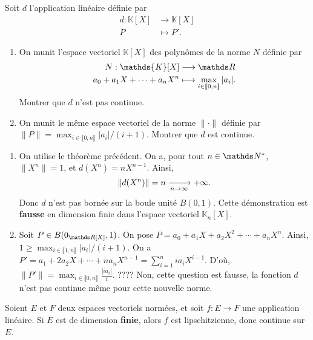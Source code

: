 \begin{exo}
	\begin{slshape}
		Soit $d$\/ l'application linéaire définie par \begin{align*}
			d: \mathds{K}[X] &\longrightarrow \mathds{K}[X] \\
			P &\longmapsto P'.
		\end{align*}
		\begin{enumerate}
			\item On munit l'espace vectoriel $\mathds{K}[X]$\/ des polynômes de la norme $N$\/ définie par \begin{align*}
					N: \mathds{K}[X] &\longrightarrow \R \\
					a_0 + a_1 X + \cdots + a_n X^n &\longmapsto \max_{i \in \llbracket 0,n \rrbracket} |a_i|.
				\end{align*}
				Montrer que $d$\/ n'est pas continue.
			\item On munit le même espace vectoriel de la norme $\|\cdot\|$\/ définie par $\|P\| = \max_{i \in \llbracket 0,n \rrbracket} |a_i| / (i+1)$. Montrer que $d$\/ est continue.
		\end{enumerate}
	\end{slshape}

	\begin{enumerate}
		\item On utilise le théorème précédent. On a, pour tout $n \in \N^*$, $\|X^n\| = 1$, et $d(X^n) = n X^{n-1}$. Ainsi, \[
				\|d(X^n)\| = n \xrightarrow[n\to \infty]{} +\infty
			.\] Donc $d$\/ n'est pas bornée sur la boule unité $B(0, 1)$.
			Cette démonstration est \textbf{fausse} en dimension finie dans l'espace vectoriel $\mathds{K}_n[X]$.
		\item Soit $P \in B(0_{\R[X]}, 1)$.
			On pose $P = a_0 + a_1 X + a_2 X^2 + \cdots + a_n X^n$. Ainsi, $1 \ge \max_{i \in \llbracket 1,n \rrbracket} |a_i| / (i+1)$.
			On a $P' = a_1 + 2a_2 X + \cdots + na_n X^{n-1} = \sum_{i=1}^n i a_i X^{i-1}$.
			D'où, $\|P'\| = \max_{i \in \llbracket 0,n \rrbracket} \frac{|i a_i|}{i}$. ????
			{\color{red}Non, cette question est fausse, la fonction $d$\/ n'est pas continue même pour cette nouvelle norme.}
	\end{enumerate}
\end{exo}

\begin{thm}
	Soient $E$\/ et $F$\/ deux espaces vectoriels normées, et soit $f : E \to F$\/ une application linéaire. Si $E$\/ est de dimension \textbf{finie}, alors $f$\/ est lipschitzienne, donc continue sur $E$.
\end{thm}

